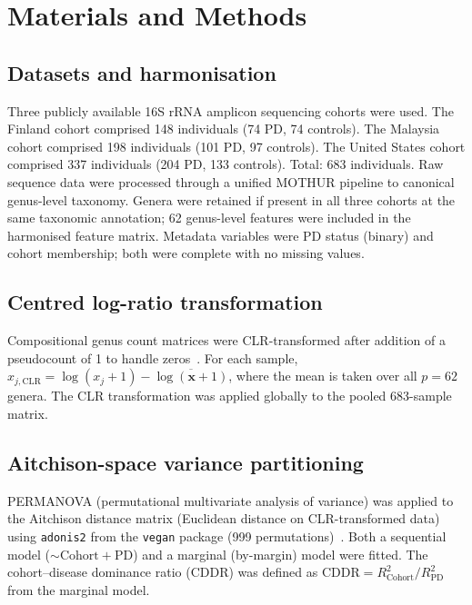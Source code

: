 \documentclass[12pt,a4paper]{article}
\begin{document}
\section{Materials and Methods}
\label{sec:methods}

\subsection{Datasets and harmonisation}

Three publicly available 16S rRNA amplicon sequencing cohorts were used.
The Finland cohort comprised 148 individuals (74 PD, 74 controls). The
Malaysia cohort comprised 198 individuals (101 PD, 97 controls). The United
States cohort comprised 337 individuals (204 PD, 133 controls). Total: 683
individuals. Raw sequence data were processed through a unified MOTHUR
pipeline to canonical genus-level taxonomy. Genera were retained if present
in all three cohorts at the same taxonomic annotation; 62 genus-level
features were included in the harmonised feature matrix. Metadata variables
were PD status (binary) and cohort membership; both were complete with no
missing values.

\subsection{Centred log-ratio transformation}

Compositional genus count matrices were CLR-transformed after addition of a
pseudocount of 1 to handle zeros~\cite{Aitchison1982}. For each sample,
$x_{j,\mathrm{CLR}} = \log(x_j + 1) - \overline{\log(\mathbf{x}+1)}$,
where the mean is taken over all $p = 62$ genera. The CLR transformation
was applied globally to the pooled 683-sample matrix.

\subsection{Aitchison-space variance partitioning}

PERMANOVA (permutational multivariate analysis of variance) was applied to
the Aitchison distance matrix (Euclidean distance on CLR-transformed data)
using \texttt{adonis2} from the \texttt{vegan} package (999
permutations)~\cite{Anderson2001,Oksanen2022}. Both a sequential model
($\sim\mathrm{Cohort} + \mathrm{PD}$) and a marginal (by-margin) model were
fitted. The cohort--disease dominance ratio (CDDR) was defined as
$\mathrm{CDDR} = R^2_{\mathrm{Cohort}} / R^2_{\mathrm{PD}}$ from the
marginal model.
\end{document}
